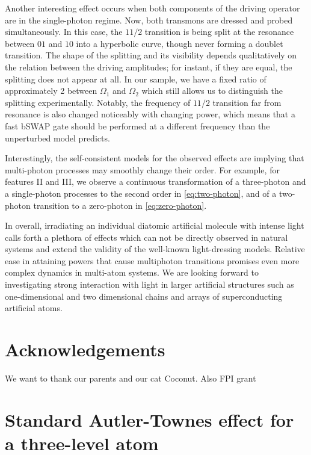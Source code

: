 \documentclass[%
 pra,
 amsmath,amssymb,
 reprint,%
]{revtex4-1}
\begin{document}
Another interesting effect occurs when both 
components of the driving operator are in the 
single-photon regime. Now, both transmons are 
dressed and probed simultaneously. In this case, 
the $11/2$ transition is being split at the resonance between $01$ and $10$ into a hyperbolic curve, though never forming a doublet transition. The shape of the splitting and its visibility 
depends qualitatively on the relation between the driving 
amplitudes; for instant, if they are equal, the splitting does not appear at all. In our sample, we have a fixed ratio 
of approximately 2 between $\Omega_1$ and 
$\Omega_2$ which still allows us to distinguish the 
splitting experimentally. Notably, the frequency of $11/2$ transition far 
from resonance is also changed noticeably with 
changing power, which means that a fast bSWAP 
gate should be performed at a different frequency 
than the unperturbed model predicts. 

Interestingly, the self-consistent models for the 
observed effects are implying that multi-photon 
processes may smoothly change their order. For 
example, for features II and III, we observe a 
continuous transformation of a three-photon and a 
single-photon processes to the second order in 
\autoref{eq:two-photon}, and of a two-photon 
transition to a zero-photon in 
\autoref{eq:zero-photon}.

In overall, irradiating an individual diatomic artificial molecule with intense light calls forth a plethora of effects which can not be directly observed in natural systems and extend the validity of the well-known light-dressing models. Relative ease in attaining powers that cause multiphoton transitions promises even more complex dynamics in multi-atom systems. We are looking forward to investigating strong interaction with light in larger artificial structures such as one-dimensional and two dimensional chains and arrays of superconducting artificial atoms.

\section{Acknowledgements}

We want to thank our parents and our cat Coconut. Also FPI grant

\appendix

\section{Standard Autler-Townes effect for a three-level atom} \label{sec:3-level-at}
\end{document}
